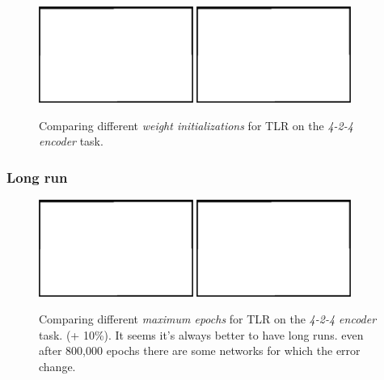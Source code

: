 \begin{figure}[H]
  \centering
  \includegraphics[width=0.45\textwidth]{img/placeholder.png}   
  \includegraphics[width=0.45\textwidth]{img/placeholder.png}    
  \caption{Comparing different \emph{weight initializations} for TLR on the \emph{4-2-4 encoder} task.}
  \label{fig:results-two-lambdas-auto4-sigma}
\end{figure}

\subsubsection{Long run} 
\label{sec:results-long-run} 

\begin{figure}[H]
  \centering
  \includegraphics[width=0.45\textwidth]{img/placeholder.png}   
  \includegraphics[width=0.45\textwidth]{img/placeholder.png}    
  \caption{Comparing different \emph{maximum epochs} for TLR on the \emph{4-2-4 encoder} task. (+ 10\%). It seems it's always better to have long runs. even after 800,000 epochs there are some networks for which the error change.}
  \label{fig:results-two-lambdas-auto4-long-run}
\end{figure}



 
